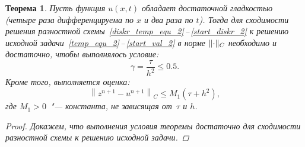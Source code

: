 \documentclass[11pt,a4paper,twoside,listtotoc,bibtotoc]{report}
\numberwithin{equation}{section}
\theoremstyle{definition}
\theoremstyle{plain}
\newtheorem*{theorem*}{Теорема}
\DeclarePairedDelimiter\norm{\lVert}{\rVert}
\begin{document}
\begin{theorem*}
%
    Пусть функция $u(x, t)$ обладает достаточной гладкостью (четыре раза дифференцируема
    по $x$ и два раза по $t$). Тогда для сходимости решения разностной
    схемы~\eqref{diskr_temp_equ_2}\,--\,\eqref{start_diskr_2} к решению
    исходной задачи~\eqref{temp_equ_2}\,--\,\eqref{start_val_2} в норме
    $\norm{\cdot}_C$ необходимо и достаточно, чтобы выполнялось условие:
    $$
        \gamma = \frac{\tau}{h^2} \leqslant 0.5.
    $$
    Кроме того, выполняется оценка:
    $$
        \left\|z^{n+1}-u^{n+1}\right\|_C \leqslant M_1\left(\tau+h^2\right),
    $$
    где $M_1 > 0$~"--- константа, не зависящая от~$\tau$ и $h$.

    \begin{proof}
        Докажем, что выполнения условия теоремы достаточно для сходимости
        разностной схемы к решению исходной задачи.


\end{proof}
\end{theorem*}
\end{document}
